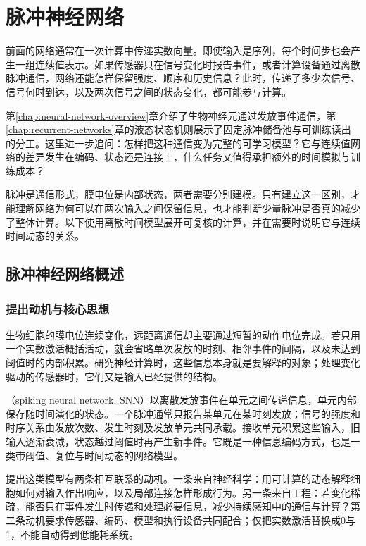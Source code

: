 \chapter{脉冲神经网络}
\label{chap:spiking-networks}

前面的网络通常在一次计算中传递实数向量。即使输入是序列，每个时间步也会产生一组连续值表示。如果传感器只在信号变化时报告事件，或者计算设备通过离散脉冲通信，网络还能怎样保留强度、顺序和历史信息？此时，传递了多少次信号、信号何时到达，以及两次信号之间的状态变化，都可能参与计算。

第\ref{chap:neural-network-overview}章介绍了生物神经元通过发放事件通信，第\ref{chap:recurrent-networks}章的液态状态机则展示了固定脉冲储备池与可训练读出的分工。这里进一步追问：怎样把这种通信变为完整的可学习模型？它与连续值网络的差异发生在编码、状态还是连接上，什么任务又值得承担额外的时间模拟与训练成本？

脉冲是通信形式，膜电位是内部状态，两者需要分别建模。只有建立这一区别，才能理解网络为何可以在两次输入之间保留信息，也才能判断少量脉冲是否真的减少了整体计算。以下使用离散时间模型展开可复核的计算，并在需要时说明它与连续时间动态的关系。

\section{脉冲神经网络概述}
\label{sec:snn-overview}

\subsection{提出动机与核心思想}
\label{sec:snn-motivation}

生物细胞的膜电位连续变化，远距离通信却主要通过短暂的动作电位完成。若只用一个实数激活概括活动，就会省略单次发放的时刻、相邻事件的间隔，以及未达到阈值时的内部积累。研究神经计算时，这些信息本身就是要解释的对象；处理变化驱动的传感器时，它们又是输入已经提供的结构。

（spiking neural network, SNN）以离散发放事件在单元之间传递信息，单元内部保存随时间演化的状态。一个脉冲通常只报告某单元在某时刻发放；信号的强度和时序关系由发放次数、发生时刻及发放单元共同承载。接收单元积累这些输入，旧输入逐渐衰减，状态越过阈值时再产生新事件。它既是一种信息编码方式，也是一类带阈值、复位与时间动态的网络模型。

提出这类模型有两条相互联系的动机。一条来自神经科学：用可计算的动态解释细胞如何对输入作出响应，以及局部连接怎样形成行为。另一条来自工程：若变化稀疏，能否只在事件发生时传递和处理必要信息，减少持续感知中的通信与计算？第二条动机要求传感器、编码、模型和执行设备共同配合；仅把实数激活替换成0与1，不能自动得到低能耗系统。


